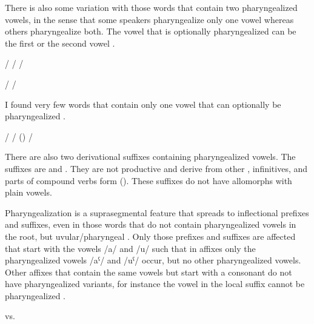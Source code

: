 There is also some variation with those words that contain two pharyngealized vowels, in the sense that some speakers pharyngealize only one vowel whereas others pharyngealize both. The vowel that is optionally pharyngealized can be the first  or the second vowel .
%
\begin{exe}
	\label{ex:pharyngealization of first vowel or both vowels}
	\begin{xlist}
		\ex	{}\slash{} 
		\ex	{}\slash{} 
		\ex	{}\slash{} 
	\end{xlist}

	\label{ex:pharyngealization of second vowel or both vowels}
	\begin{xlist}
		\ex	{}\slash{} \sqt{secret, secretly}
		\ex	{}\slash{} \sqt{boy, son}
	\end{xlist}
\end{exe}

I found very few words that contain only one vowel that can optionally be pharyngealized .
%
\begin{exe}
	\ex	\label{ex:optional pharyngealization vowels phon}
	\begin{xlist}
		\ex	{}\slash{} \sqt{snow}
		\ex	{}\slash{}  (\isi{ideophone})
		\ex	{}\slash{} \sqt{wine}
	\end{xlist}
\end{exe}

There are also two derivational suffixes containing pharyngealized vowels. The suffixes are  and . They are not productive and derive   from other , infinitives, and parts of compound verbs form (). These suffixes do not have allomorphs with plain vowels.

Pharyngealization is a suprasegmental feature that spreads to inflectional prefixes and suffixes, even in those words that do not contain pharyngealized vowels in the root, but uvular/pharyngeal . Only those prefixes and suffixes are affected that start with the vowels /a/ and /u/ such that in affixes only the pharyngealized vowels /aˁ/ and /uˁ/ occur, but no other pharyngealized vowels. Other affixes that contain the same vowels but start with a consonant do not have pharyngealized variants, for instance the vowel in the local  suffix  cannot be pharyngealized . 
%
\begin{exe}
	\ex	\label{ex:pharyngealization na phon}
\TabPositions{12em}
	  \tab vs.  
\end{exe}

